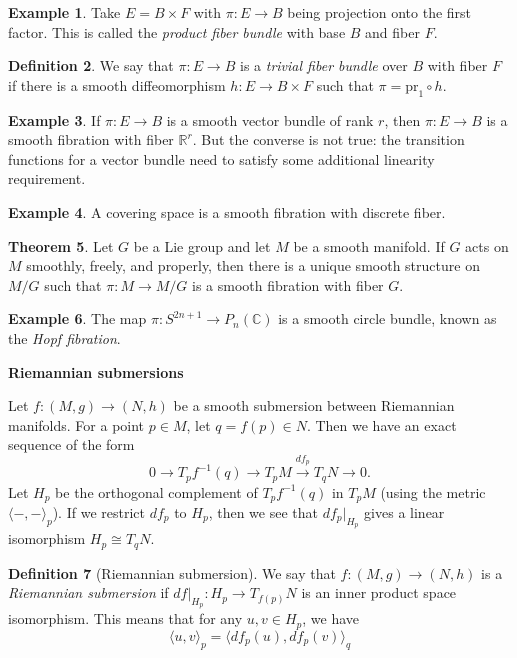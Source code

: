 \documentclass{amsart}
\numberwithin{equation}{section}
\newcommand{\bR}{\mathbb{R}}
\theoremstyle{definition}
\newtheorem{definition}{Definition} [section]
\newtheorem{example}[definition]{Example}
\theoremstyle{theorem}
\newtheorem{theorem}[definition]{Theorem}
\begin{document}
\begin{example}
Take $E = B \times F$ with $\pi : E \to B$ being projection onto the first factor. This is called the {\em product fiber bundle} with base $B$ and fiber $F$.
\end{example}

\begin{definition}
We say that $\pi : E \to B$ is a {\em trivial fiber bundle} over $B$ with fiber $F$ if there is a smooth diffeomorphism $h : E \to B \times F$ such that $\pi = \mathrm{pr}_1 \circ h$. 
\end{definition}

\begin{example}
If $\pi : E \to B$ is a smooth vector bundle of rank $r$, then $\pi : E \to B$ is a smooth fibration with fiber $\bR^r$. But the converse is not true: the transition functions for a vector bundle need to satisfy some additional linearity requirement. 
\end{example}

\begin{example}
A covering space is a smooth fibration with discrete fiber. 
\end{example}

\begin{theorem}
Let $G$ be a Lie group and let $M$ be a smooth manifold. If $G$ acts on $M$ smoothly, freely, and properly, then there is a unique smooth structure on $M/G$ such that $\pi : M \to M/G$ is a smooth fibration with fiber $G$. 
\end{theorem}

\begin{example}
The map $\pi : S^{2n+1} \to P_n(\mathbb{C})$ is a smooth circle bundle, known as the {\em Hopf fibration}. 
\end{example}

\noindent
{\bf \large Riemannian submersions}

Let $f : (M,g) \to (N,h)$ be a smooth submersion between Riemannian manifolds. For a point $p \in M$, let $q = f(p) \in N$. Then we have an exact sequence of the form
\[
0 \to T_pf^{-1}(q) \to T_pM \stackrel{df_p}{\to} T_qN \to 0.
\]
Let $H_p$ be the orthogonal complement of $T_pf^{-1}(q)$ in $T_pM$ (using the metric $\langle - , - \rangle_p$). If we restrict $df_p$ to $H_p$, then we see that $df_p|_{H_p}$ gives a
linear isomorphism $H_p \cong T_qN$. 

\begin{definition}[Riemannian submersion]
We say that $f : (M,g) \to (N,h)$ is a {\em Riemannian submersion} if $df|_{H_p} : H_p \to T_{f(p)}N$ is an inner product space isomorphism. This means that for any $u,v \in H_p$, we have 
\[
\langle u, v \rangle_p = \langle df_p(u), df_p(v) \rangle_q
\]
\end{definition}
\end{document}
